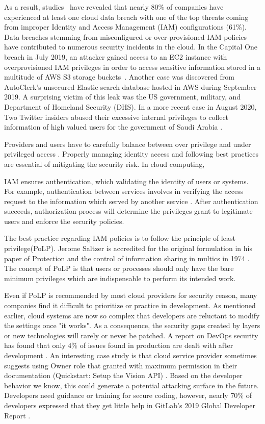 \documentclass[sigconf]{acmart}
\begin{document}
As a result, studies~\cite{Ermetic2020,IBMSecurity2020} have revealed that nearly 80\% of companies have experienced at least one cloud data breach with one of the top threats
coming from improper Identity and Access Management (IAM) configurations (61\%).
Data breaches stemming from misconfigured or over-provisioned IAM
policies have contributed to numerous security incidents in the cloud.
In the Capital One breach in July 2019, an attacker gained access to an EC2 instance with
overprovisioned IAM privileges in order to access sensitive information stored in a multitude
of AWS S3 storage buckets~\cite{Parimi2019}. 
Another case was discovered from AutoClerk's unsecured Elastic search database hosted in AWS during September 2019. A surprising victim of this leak was the US government, military, and Department of Homeland Security (DHS). \cite{Fawkes2020}
In a more recent case in August 2020, Two Twitter insiders abused their excessive internal privileges to collect information of high valued users for the government of Saudi Arabia \cite{Newman2019}.

Providers and users have to carefully balance between over privilege and under privileged access \cite{Sanders2018}. Properly managing identity access and following best practices are essential of mitigating the security risk. 
In cloud computing, 

IAM ensures authentication, which validating the identity of users or systems. For example, authentication between services involves in verifying the access request to the information which served by another service \cite{AlmullaSameeraAbdulrahmanandYeun2010}.
After authentication succeeds, authorization process will determine the privileges grant to legitimate users and enforce the security policies.


The best practice regarding IAM policies is to follow the principle of least privilege(PoLP). Jerome Saltzer is accredited for the original formulation in  his paper of  Protection and the control of information sharing in multics in 1974 \cite{Saltzer1974}. The concept of PoLP is that users or processes should only have the bare minimum privileges which are indispensable to perform its intended work.

Even if PoLP is recommended by most cloud providers for security reason, many companies find it difficult to prioritize or practice in development. 
As mentioned earlier, cloud systems are now so complex that developers are reluctant to modify the settings once "it works". As a consequence, the security gaps created by layers or new technologies will rarely or never be patched. A report on DevOps security has found that only 4\% of issues found in production are dealt with after development \cite{Foremski}. 
An interesting case study is that cloud service provider sometimes suggests using Owner role that granted with maximum permission in their documentation (Quickstart: Setup the Vision API) \cite{GoogleVis}. Based on the developer behavior we know, this could generate a potential attacking surface in the future.
Developers need guidance or training for secure coding, however, nearly 70\% of developers expressed that they get little help in GitLab's 2019 Global Developer Report  \cite{Gitlab2019}.
\end{document}
